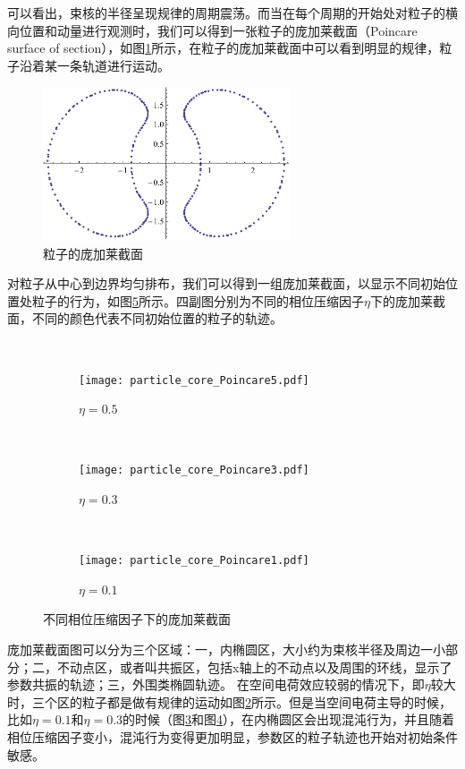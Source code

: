 可以看出，束核的半径呈现规律的周期震荡。而当在每个周期的开始处对粒子的横向位置和动量进行观测时，我们可以得到一张粒子的庞加莱截面（Poincare surface of section），如图\ref{fig:particle_core_particle}所示，在粒子的庞加莱截面中可以看到明显的规律，粒子沿着某一条轨道进行运动。
\begin{figure}[!tbh]
    \centering
    \includegraphics[width=0.65\textwidth]{Img/particle_core_particle.pdf}
    \caption{粒子的庞加莱截面}
    \label{fig:particle_core_particle}
\end{figure}

对粒子从中心到边界均匀排布，我们可以得到一组庞加莱截面，以显示不同初始位置处粒子的行为，如图\ref{fig:particle_core_Poincare}所示。四副图分别为不同的相位压缩因子$\eta$下的庞加莱截面，不同的颜色代表不同初始位置的粒子的轨迹。
\begin{figure}[!htbp]
  \centering
  ~%
  \begin{subfigure}[b]{0.6\textwidth}
    \texttt{[image: particle\_core\_Poincare5.pdf]}
    \caption{$\eta = 0.5$}
    \label{fig:particle_core_Poincare5}
  \end{subfigure}
  ~
  \begin{subfigure}[b]{0.6\textwidth}
    \texttt{[image: particle\_core\_Poincare3.pdf]}
    \caption{$\eta = 0.3$}
    \label{fig:particle_core_Poincare3}
  \end{subfigure}%
  ~
  \begin{subfigure}[b]{0.6\textwidth}
    \texttt{[image: particle\_core\_Poincare1.pdf]}
    \caption{$\eta = 0.1$}
    \label{fig:particle_core_Poincare1}
  \end{subfigure}%
  \caption{不同相位压缩因子下的庞加莱截面}
  \label{fig:particle_core_Poincare}
\end{figure}

庞加莱截面图可以分为三个区域：一，内椭圆区，大小约为束核半径及周边一小部分；二，不动点区，或者叫共振区，包括x轴上的不动点以及周围的环线，显示了参数共振的轨迹；三，外围类椭圆轨迹。
在空间电荷效应较弱的情况下，即$\eta$较大时，三个区的粒子都是做有规律的运动如图\ref{fig:particle_core_Poincare5}所示。但是当空间电荷主导的时候，比如$\eta=0.1$和$\eta=0.3$的时候（图\ref{fig:particle_core_Poincare3}和图\ref{fig:particle_core_Poincare1}），在内椭圆区会出现混沌行为，并且随着相位压缩因子变小，混沌行为变得更加明显，参数区的粒子轨迹也开始对初始条件敏感。

